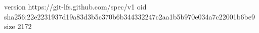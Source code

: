 version https://git-lfs.github.com/spec/v1
oid sha256:22e2231937d19a83d3b5c370b6b344332247c2aa1b5b970e034a7c22001b6be9
size 2172
